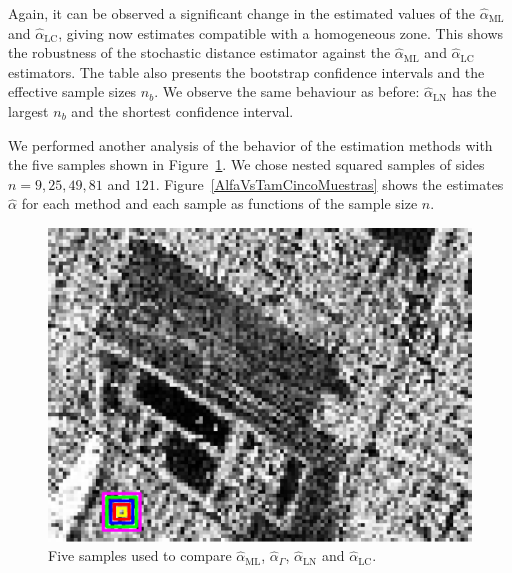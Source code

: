 \documentclass[twocolumn]{svjour3}
\begin{document}
Again, it can be observed a significant change in the estimated values of the $\widehat{\alpha}_{\text{{ML}}}$ and $\widehat{\alpha}_{\text{{LC}}}$, giving now estimates compatible with a homogeneous zone. This shows the robustness of the stochastic distance estimator against the $\widehat{\alpha}_{\text{{ML}}}$ and $\widehat{\alpha}_{\text{{LC}}}$ estimators.
The table also presents the bootstrap confidence intervals and the effective sample sizes $n_b$. 
We observe the same behaviour as before: $\widehat{\alpha}_{\text{{LN}}}$ has the largest $n_b$ and the shortest confidence interval.


We performed another analysis of the behavior of the estimation methods with the five samples shown in Figure~\ref{CincoMuestras}. 
We chose nested squared samples of sides $n=9,25,49,81$ and $121$. 
Figure~\ref{AlfaVsTamCincoMuestras} shows the estimates $\widehat{\alpha}$ for each method and each sample as functions of the sample size $n$. 

\begin{figure}[hbt]
	\centering
	\includegraphics[width=0.7\linewidth]{../../../Figures/PaperTesis/CincoMuestras.eps}
	\caption{Five samples used to compare $\widehat{\alpha}_{\text{{ML}}}$, $\widehat{\alpha}_{\Gamma}$, $\widehat{\alpha}_{\text{{LN}}}$ and  $\widehat{\alpha}_{\text{{LC}}}$.}\label{CincoMuestras}
\end{figure}
\end{document}
